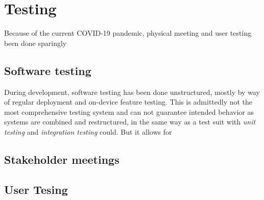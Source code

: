 \chapter{Testing}


Because of the current COVID-19 pandemic, physical meeting and user testing been done sparingly

\section{Software testing}
During development, software testing has been done unstructured, mostly by way of regular deployment and on-device feature testing. This is admittedly not the most comprehensive testing system and can not guarantee intended behavior as systems are combined and restructured, in the same way as a test suit with \textit{unit testing} and \textit{integration testing} could. But it allows for 



\section{Stakeholder meetings}


\section{User Tesing}